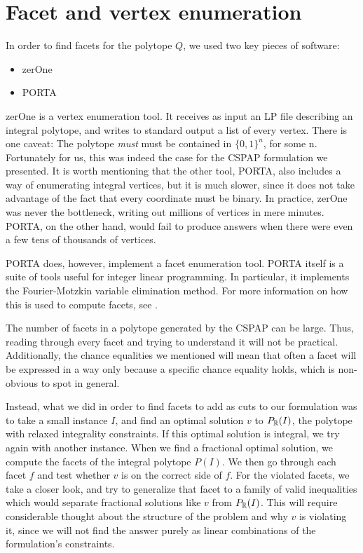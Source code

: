 \chapter{Facet and vertex enumeration}
\label{app:facets}

In order to find facets for the polytope $Q$, we used two key pieces of software:
\begin{itemize}
\item zerOne\cite{Bussieck:1998:VSS:302316.302321}
\item PORTA\cite{PORTA}
\end{itemize}

zerOne is a vertex enumeration tool. It receives as input an LP file describing an integral polytope, and writes to standard output a list of every vertex. There is one caveat: The polytope \emph{must} must be contained in $\{0, 1\}^n$, for some n. Fortunately for us, this was indeed the case for the CSPAP formulation we presented. It is worth mentioning that the other tool, PORTA, also includes a way of enumerating integral vertices, but it is much slower, since it does not take advantage of the fact that every coordinate must be binary. In practice, zerOne was never the bottleneck, writing out millions of vertices in mere minutes. PORTA, on the other hand, would fail to produce answers when there were even a few tens of thousands of vertices.

PORTA does, however, implement a facet enumeration tool. PORTA itself is a suite of tools useful for integer linear programming. In particular, it implements the Fourier-Motzkin variable elimination method. For more information on how this is used to compute facets, see \cite{z-lop-95}.

The number of facets in a polytope generated by the CSPAP can be large. Thus, reading through every facet and trying to understand it will not be practical. Additionally, the chance equalities we mentioned will mean that often a facet will be expressed in a way only because a specific chance equality holds, which is non-obvious to spot in general.

Instead, what we did in order to find facets to add as cuts to our formulation was to take a small instance $I$, and find an optimal solution $v$ to $P_{\mathbb{R}}(I)$, the polytope with relaxed integrality constraints. If this optimal solution is integral, we try again with another instance. When we find a fractional optimal solution, we compute the facets of the integral polytope $P(I)$. We then go through each facet $f$ and test whether $v$ is on the correct side of $f$. For the violated facets, we take a closer look, and try to generalize that facet to a family of valid inequalities which would separate fractional solutions like $v$ from $P_{\mathbb{R}}(I)$. This will require considerable thought about the structure of the problem and why $v$ is violating it, since we will not find the answer purely as linear combinations of the formulation's constraints.


